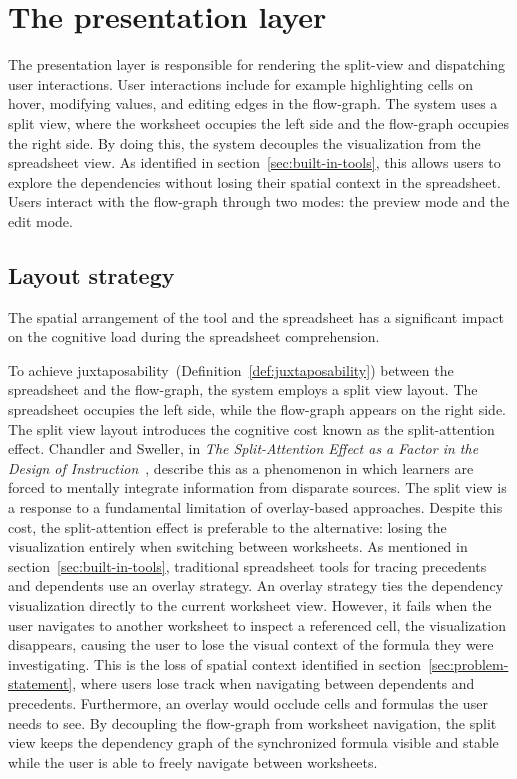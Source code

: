 \section{The presentation layer}\label{sec: presentation-layer} 
The presentation layer is responsible for rendering the split-view and dispatching user interactions. User interactions include for example highlighting cells on hover, modifying values, and editing edges in the flow-graph. The system uses a split view, where the worksheet occupies the left side and the flow-graph occupies the right side. By doing this, the system decouples the visualization from the spreadsheet view. As identified in section~\ref{sec:built-in-tools}, this allows users to explore the dependencies without losing their spatial context in the spreadsheet. Users interact with the flow-graph through two modes: the preview mode and the edit mode.

\subsection{Layout strategy}
The spatial arrangement of the tool and the spreadsheet has a significant impact on the cognitive load during the spreadsheet comprehension.

To achieve juxtaposability~(Definition~\ref{def:juxtaposability}) between the spreadsheet and the flow-graph, the system employs a split view layout. The spreadsheet occupies the left side, while the flow-graph appears on the right side.
The split view layout introduces the cognitive cost known as the split-attention effect. Chandler and Sweller, in \textit{The Split-Attention Effect as a Factor in the Design of Instruction}~\cite{chandler_split-attention_1992}, describe this as a phenomenon in which learners are forced to mentally integrate information from disparate sources. The split view is a response to a fundamental limitation of overlay-based approaches. Despite this cost, the split-attention effect is preferable to the alternative: losing the visualization entirely when switching between worksheets. As mentioned in section~\ref{sec:built-in-tools}, traditional spreadsheet tools for tracing precedents and dependents use an overlay strategy. An overlay strategy ties the dependency visualization directly to the current worksheet view. However, it fails when the user navigates to another worksheet to inspect a referenced cell, the visualization disappears, causing the user to lose the visual context of the formula they were investigating. This is the loss of spatial context identified in section~\ref{sec:problem-statement}, where users lose track when navigating between dependents and precedents. Furthermore, an overlay would occlude cells and formulas the user needs to see. By decoupling the flow-graph from worksheet navigation, the split view keeps the dependency graph of the synchronized formula visible and stable while the user is able to freely navigate between worksheets.

